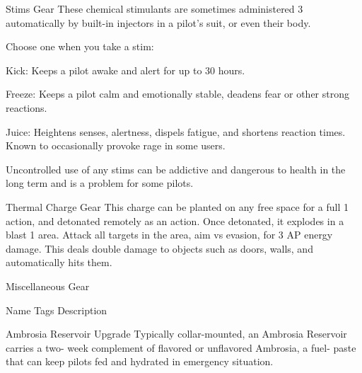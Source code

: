                                                                                                                           


  Stims                   Gear       These chemical stimulants are sometimes administered                   3 
                                     automatically by built-in injectors in a pilot’s suit, or even  
                                     their body. 
 
                                     Choose one when you take a stim:
 
                                     Kick: Keeps a pilot awake and alert for up to 30 hours. 
 
                                     Freeze: Keeps a pilot calm and emotionally stable,  
                                     deadens fear or other strong reactions.
 
                                     Juice: Heightens senses, alertness, dispels fatigue, and  
                                     shortens reaction times. Known to occasionally provoke  
                                     rage in some users.
 

                                     Uncontrolled use of any stims can be addictive and  
                                     dangerous to health in the long term and is a problem for  
                                     some pilots.  

  Thermal Charge          Gear       This charge can be planted on any free space for a full                1 
                                     action, and detonated remotely as an action. Once  
                                     detonated, it explodes in a blast 1 area. Attack all targets  
                                     in the area, aim vs evasion, for 3 AP energy damage. This  
                                     deals double damage to objects such as doors, walls, and  
                                     automatically hits them. 

                                                Miscellaneous Gear  

          Name                   Tags                                       Description 

Ambrosia Reservoir            Upgrade        Typically collar-mounted, an Ambrosia Reservoir carries a two- 
                                             week complement of flavored or unflavored Ambrosia, a fuel- 
                                             paste that can keep pilots fed and hydrated in emergency  
                                             situation.  

